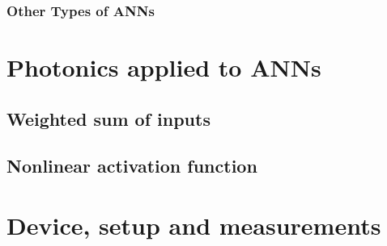 \documentclass[12pt,a4paper]{book}
\begin{document}
\subsection{Other Types of ANNs}

\chapter{Photonics applied to ANNs}
\section{Weighted sum of inputs}
\section{Nonlinear activation function}

\chapter{Device, setup and measurements}
\end{document}
